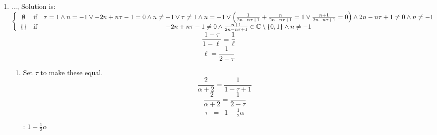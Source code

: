 \documentclass{article}
\begin{document}
\begin{enumerate}
\item ..., Solution is: $\left\{ 
\begin{array}{ccc}
\emptyset  & \text{if} & \tau =1\wedge n=-1\vee -2n+n\tau -1=0\wedge n\neq
-1\vee \tau \neq 1\wedge n=-1\vee \left( \frac{1}{2n-n\tau +1}+\frac{n}{%
2n-n\tau +1}=1\vee \frac{n+1}{2n-n\tau +1}=0\right) \wedge 2n-n\tau +1\neq
0\wedge n\neq -1 \\ 
\left\{ {}\right\}  & \text{if} & -2n+n\tau -1\neq 0\wedge \frac{n+1}{%
2n-n\tau +1}\in 
\mathbb{C}
\setminus \left\{ 0,1\right\} \wedge n\neq -1%
\end{array}%
\right. \allowbreak $%
\begin{equation*}
\frac{1-\tau }{1-\ell }=\frac{1}{\ell }
\end{equation*}%
\begin{equation*}
\ell =\frac{1}{2-\tau }
\end{equation*}

\begin{enumerate}
\item Set $\tau $ to make these equal. 
\begin{equation*}
\frac{2}{\alpha +2}=\frac{1}{1-\tau +1}
\end{equation*}%
\begin{equation*}
\frac{2}{\alpha +2}=\frac{1}{2-\tau }
\end{equation*}%
\begin{eqnarray*}
\tau  &=&1-\frac{1}{2}\alpha  \\
&&
\end{eqnarray*}
: $1-\frac{1}{2}\alpha $
\end{enumerate}


\end{enumerate}
\end{document}
